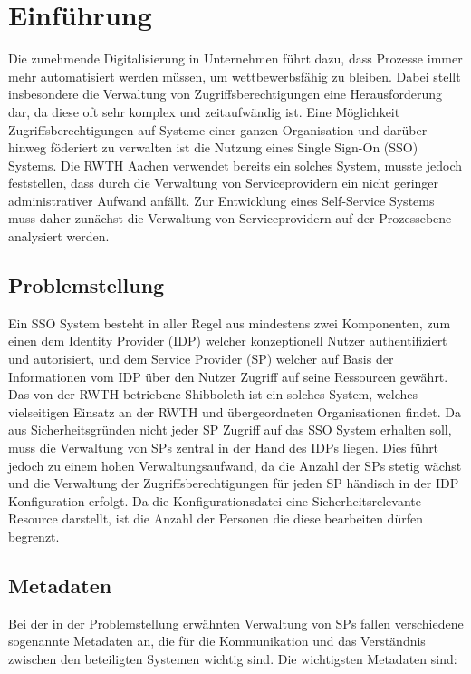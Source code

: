 \documentclass[a4paper, fontsize=12pt]{scrartcl}
\begin{document}


\tableofcontents
\newpage


\section{Einführung}\label{sec:einfuehrung}
Die zunehmende Digitalisierung in Unternehmen führt dazu, dass Prozesse immer mehr automatisiert werden müssen, um wettbewerbsfähig zu bleiben.
Dabei stellt insbesondere die Verwaltung von Zugriffsberechtigungen eine Herausforderung dar, da diese oft sehr komplex und zeitaufwändig ist.
Eine Möglichkeit Zugriffsberechtigungen auf Systeme einer ganzen Organisation und darüber hinweg föderiert zu verwalten ist die Nutzung eines Single Sign-On (SSO) Systems.
Die RWTH Aachen verwendet bereits ein solches System, musste jedoch feststellen, dass durch die Verwaltung von Serviceprovidern ein nicht geringer administrativer Aufwand anfällt.
Zur Entwicklung eines Self-Service Systems muss daher zunächst die Verwaltung von Serviceprovidern auf der Prozessebene analysiert werden.

\subsection{Problemstellung}\label{subsec:problemstellung}
Ein SSO System besteht in aller Regel aus mindestens zwei Komponenten, zum einen dem Identity Provider (IDP) welcher konzeptionell Nutzer authentifiziert und autorisiert, und dem Service Provider (SP) welcher auf Basis der Informationen vom IDP über den Nutzer Zugriff auf seine Ressourcen gewährt.
Das von der RWTH betriebene Shibboleth ist ein solches System, welches vielseitigen Einsatz an der RWTH und übergeordneten Organisationen findet.
Da aus Sicherheitsgründen nicht jeder SP Zugriff auf das SSO System erhalten soll, muss die Verwaltung von SPs zentral in der Hand des IDPs liegen. 
Dies führt jedoch zu einem hohen Verwaltungsaufwand, da die Anzahl der SPs stetig wächst und die Verwaltung der Zugriffsberechtigungen für jeden SP händisch in der IDP Konfiguration erfolgt.
Da die Konfigurationsdatei eine Sicherheitsrelevante Resource darstellt, ist die Anzahl der Personen die diese bearbeiten dürfen begrenzt.

\subsection{Metadaten}
Bei der in der Problemstellung erwähnten Verwaltung von SPs fallen verschiedene sogenannte Metadaten an, die für die Kommunikation und das Verständnis zwischen den beteiligten Systemen wichtig sind. Die wichtigsten Metadaten sind:
\end{document}
